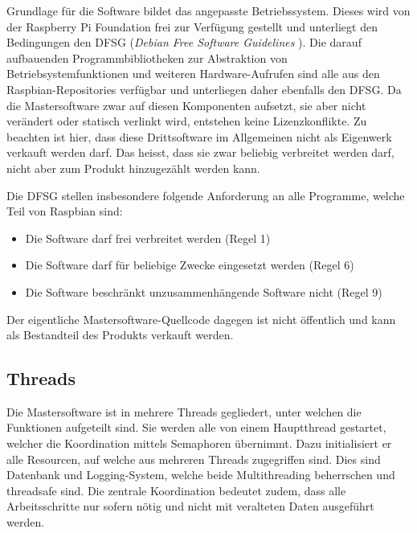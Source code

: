 Grundlage  f\"ur die  Software  bildet  das angepasste  Betriebssystem. Dieses
wird  von  der Raspberry  Pi  Foundation  frei  zur Verf\"ugung  gestellt  und
unterliegt den  Bedingungen den  DFSG (\emph{Debian Free  Software Guidelines}
\cite{ref:socialContract}). Die  darauf  aufbauenden Programmbibliotheken  zur
Abstraktion  von Betriebsystemfunktionen  und weiteren  Hardware-Aufrufen sind
alle aus den Raspbian-Repositories verf\"ugbar und unterliegen daher ebenfalls
den  DFSG.   Da  die  Mastersoftware zwar  auf  diesen  Komponenten  aufsetzt,
sie  aber  nicht ver\"andert  oder  statisch  verlinkt wird,  entstehen  keine
Lizenzkonflikte. Zu beachten ist hier, dass diese Drittsoftware im Allgemeinen
nicht als Eigenwerk  verkauft werden darf. Das heisst, dass  sie zwar beliebig
verbreitet werden darf, nicht aber zum Produkt hinzugez\"ahlt werden kann.

Die DFSG stellen  insbesondere folgende Anforderung an  alle Programme, welche
Teil von Raspbian sind:

\begin{itemize}
    \tightlist
\item
    Die Software darf frei verbreitet werden (Regel 1)
\item
    Die Software darf f\"ur beliebige Zwecke eingesetzt werden (Regel 6)
\item
    Die Software beschr\"ankt unzusammenh\"angende Software nicht (Regel 9)
\end{itemize}

Der eigentliche  Mastersoftware-Quellcode dagegen  ist nicht  \"offentlich und
kann als Bestandteil des Produkts verkauft werden.



\subsection{Threads}
\label{subsec:software:master:threads}


Die  Mastersoftware  ist in  mehrere  Threads  gegliedert, unter  welchen  die
Funktionen aufgeteilt  sind. Sie werden alle von  einem Hauptthread gestartet,
welcher die Koordination mittels Semaphoren \"ubernimmt. Dazu initialisiert er
alle  Resourcen,  auf  welche  aus  mehreren  Threads  zugegriffen  sind. Dies
sind  Datenbank und  Logging-System, welche  beide Multithreading  beherrschen
und  threadsafe  sind. Die zentrale  Koordination  bedeutet  zudem, dass  alle
Arbeitsschritte nur sofern n\"otig und nicht mit veralteten Daten ausgef\"uhrt
werden.

